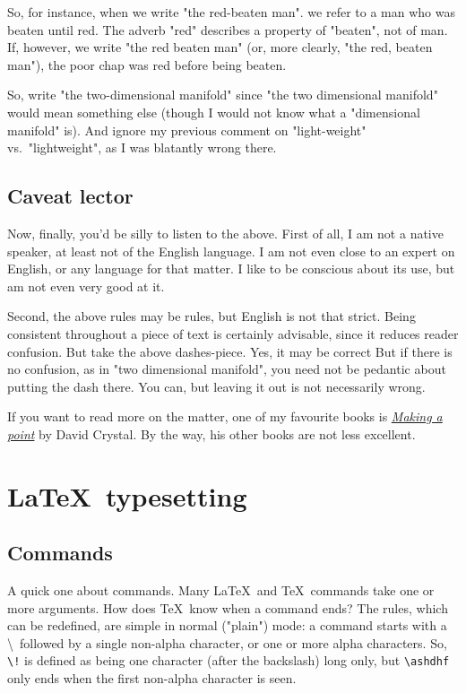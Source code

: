 \documentclass{article}
\begin{document}
So, for instance, when we write "the red-beaten man". we refer to a man who was beaten until red.  The adverb "red" describes a property of "beaten", not of man.  If, however, we write "the red beaten man" (or, more clearly, "the red, beaten man"), the poor chap was red before being beaten.

So, write "the two-dimensional manifold" since "the two dimensional manifold" would mean something else (though I would not know what a "dimensional manifold" is).  And ignore my previous comment on "light-weight" vs.\ "lightweight", as I was blatantly wrong there.


\subsection{Caveat lector}

Now, finally, you'd be silly to listen to the above.
First of all, I am not a native speaker, at least not of the English language.  
I am not even close to an expert on English, or any language for that matter.
I like to be conscious about its use, but am not even very good at it.

Second, the above rules may be rules, but English is not that strict.
Being consistent throughout a piece of text is certainly advisable, since it reduces reader confusion.
But take the above dashes-piece.
Yes, it may be correct
 But if there is no confusion, as in "two dimensional manifold", you need not be pedantic about putting the dash there.
 You can, but leaving it out is not necessarily wrong.

If you want to read more on the matter, one of my favourite books is \href{https://profilebooks.com/making-a-point.html}{\textsl{Making a point}} by David Crystal. 
By the way, his other books are not less excellent.


\section{\LaTeX\ typesetting}
\subsection{Commands}
A quick one about commands.  Many \LaTeX\ and \TeX\ commands take one or more 
arguments. How does \TeX\ know when a command ends? The rules, which can be
redefined, are simple in normal ("plain") mode:
	a command starts with a \textbackslash\ followed by a single
  	non-alpha character, or one or more alpha characters.  So,
	\verb+\!+ is defined as being one character (after the backslash)
	long only, but \verb+\ashdhf+ only ends when the first non-alpha
	character is seen.
\end{document}
